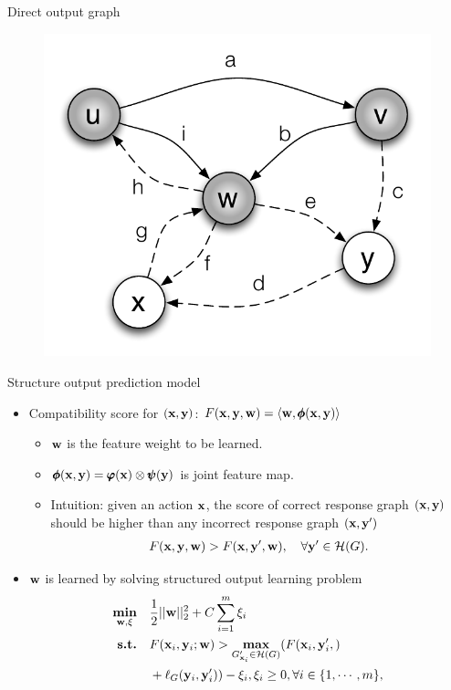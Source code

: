 \documentclass[first=dgreen,second=purple,logo=red]{aaltoslides}
\begin{document}
\begin{frame}{Direct output graph}
\begin{multicols}{2}
\begin{figure}
		\includegraphics[scale=0.25]{./figures/propagation_example.pdf}
	\end{figure}
	\end{multicols}
\end{frame}

\begin{frame}{Structure output prediction model}
	\begin{itemize}
		\item Compatibility score for $(\mathbf {x},\mathbf {y})$: $F(\mathbf {x},\mathbf {y},\mathbf {w}) = \langle \mathbf {w}, \pmb \phi(\mathbf {x},\mathbf {y}) \rangle$
			\begin{itemize}\footnotesize
				\item $\mathbf {w}$ is the feature weight to be learned.
				\item $\pmb \phi(\mathbf {x},\mathbf {y})=\pmb \varphi(\mathbf {x})\otimes\pmb \psi(\mathbf {y})$ is joint feature map.
				\item Intuition: given an action $\mathbf {x}$, the score of correct response graph $(\mathbf {x},\mathbf {y})$ should be higher than any incorrect response graph $(\mathbf {x},\mathbf {y}')$
				\begin{align*}
					F(\mathbf {x},\mathbf {y},\mathbf {w})>F(\mathbf {x},\mathbf {y}',\mathbf {w}), \quad \forall \mathbf {y}'\in\mathcal{H}(G).
				\end{align*}
			\end{itemize}
		\item $\mathbf {w}$ is learned by solving structured output learning problem
		\begin{align*}
			\underset{\mathbf {w},\xi}{\textbf{min}} &\quad \frac{1}{2}||\mathbf {w}||^2_2+C\sum_{i=1}^{m}\xi_i \\
			\textbf{s.t.} &\quad F(\mathbf {x}_i,\mathbf {y}_i;\mathbf {w}) > \underset{G_{\mathbf {x}_i}'\in\mathcal{H}(G)}{\textbf{max}} (F(\mathbf {x}_i,\mathbf {y}_i', )\\
			&\quad +\ell_G(\mathbf {y}_i,\mathbf {y}_i'))-\xi_i, \xi_i\ge 0,\forall i\in\{1,\cdots,m\},
		\end{align*}
	\end{itemize}
\end{frame}
\end{document}
